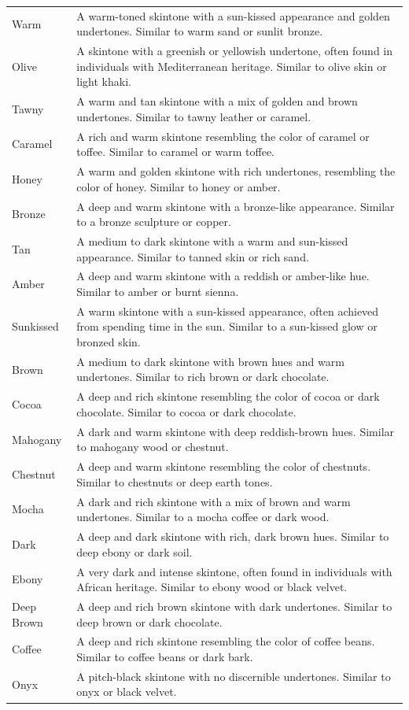 \begin{longtable}[]{@{}
  >{\raggedright\arraybackslash}p{}
  >{\raggedright\arraybackslash}p{}@{}}
Warm & A warm-toned skintone with a sun-kissed appearance and golden
undertones. Similar to warm sand or sunlit bronze. \\
Olive & A skintone with a greenish or yellowish undertone, often found
in individuals with Mediterranean heritage. Similar to olive skin or
light khaki. \\
Tawny & A warm and tan skintone with a mix of golden and brown
undertones. Similar to tawny leather or caramel. \\
Caramel & A rich and warm skintone resembling the color of caramel or
toffee. Similar to caramel or warm toffee. \\
Honey & A warm and golden skintone with rich undertones, resembling the
color of honey. Similar to honey or amber. \\
Bronze & A deep and warm skintone with a bronze-like appearance. Similar
to a bronze sculpture or copper. \\
Tan & A medium to dark skintone with a warm and sun-kissed appearance.
Similar to tanned skin or rich sand. \\
Amber & A deep and warm skintone with a reddish or amber-like hue.
Similar to amber or burnt sienna. \\
Sunkissed & A warm skintone with a sun-kissed appearance, often achieved
from spending time in the sun. Similar to a sun-kissed glow or bronzed
skin. \\
Brown & A medium to dark skintone with brown hues and warm undertones.
Similar to rich brown or dark chocolate. \\
Cocoa & A deep and rich skintone resembling the color of cocoa or dark
chocolate. Similar to cocoa or dark chocolate. \\
Mahogany & A dark and warm skintone with deep reddish-brown hues.
Similar to mahogany wood or chestnut. \\
Chestnut & A deep and warm skintone resembling the color of chestnuts.
Similar to chestnuts or deep earth tones. \\
Mocha & A dark and rich skintone with a mix of brown and warm
undertones. Similar to a mocha coffee or dark wood. \\
Dark & A deep and dark skintone with rich, dark brown hues. Similar to
deep ebony or dark soil. \\
Ebony & A very dark and intense skintone, often found in individuals
with African heritage. Similar to ebony wood or black velvet. \\
Deep Brown & A deep and rich brown skintone with dark undertones.
Similar to deep brown or dark chocolate. \\
Coffee & A deep and rich skintone resembling the color of coffee beans.
Similar to coffee beans or dark bark. \\
Onyx & A pitch-black skintone with no discernible undertones. Similar to
onyx or black velvet. \\
\bottomrule
\end{longtable}

